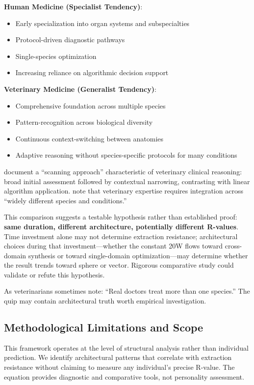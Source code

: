 \textbf{Human Medicine (Specialist Tendency)}:
\begin{itemize}
    \item Early specialization into organ systems and subspecialties
    \item Protocol-driven diagnostic pathways
    \item Single-species optimization
    \item Increasing reliance on algorithmic decision support
\end{itemize}

\textbf{Veterinary Medicine (Generalist Tendency)}:
\begin{itemize}
    \item Comprehensive foundation across multiple species
    \item Pattern-recognition across biological diversity
    \item Continuous context-switching between anatomies
    \item Adaptive reasoning without species-specific protocols for many conditions
\end{itemize}

\citet{lewis2022} document a ``scanning approach'' characteristic of veterinary clinical reasoning: broad initial assessment followed by contextual narrowing, contrasting with linear algorithm application. \citet{vandeweerd2013} note that veterinary expertise requires integration across ``widely different species and conditions.''

This comparison suggests a testable hypothesis rather than established proof: \textbf{same duration, different architecture, potentially different R-values}. Time investment alone may not determine extraction resistance; architectural choices during that investment—whether the constant 20W flows toward cross-domain synthesis or toward single-domain optimization—may determine whether the result trends toward sphere or vector. Rigorous comparative study could validate or refute this hypothesis.

As veterinarians sometimes note: ``Real doctors treat more than one species.'' The quip may contain architectural truth worth empirical investigation.

\subsection{Methodological Limitations and Scope}

This framework operates at the level of structural analysis rather than individual prediction. We identify architectural patterns that correlate with extraction resistance without claiming to measure any individual's precise R-value. The equation provides diagnostic and comparative tools, not personality assessment.

